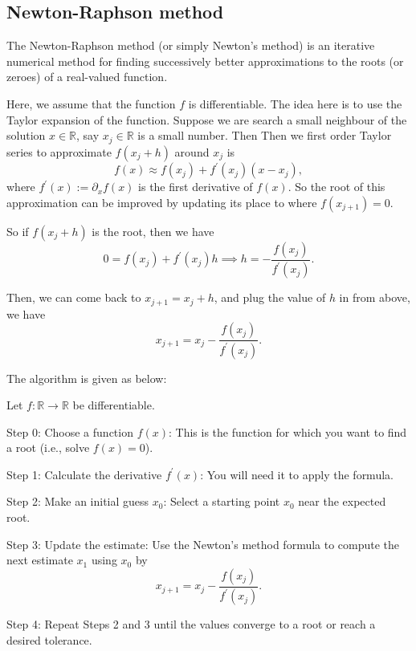 \documentclass[
  letterpaper,
  DIV=11,
  numbers=noendperiod]{scrreprt}
\begin{document}
\subsection{Newton-Raphson method}\label{newton-raphson-method}

The Newton-Raphson method (or simply Newton's method) is an iterative
numerical method for finding successively better approximations to the
roots (or zeroes) of a real-valued function.

Here, we assume that the function \(f\) is differentiable. The idea here
is to use the Taylor expansion of the function. Suppose we are search a
small neighbour of the solution \(x \in \mathbb R\), say
\(x_j \in \mathbb R\) is a small number. Then Then we first order Taylor
series to approximate \(f(x_j+h)\) around \(x_j\) is \[
f(x)\approx f(x_j) +  f^\prime(x_j) (x-x_j),
\] where \(f^\prime(x) := \partial_x f(x)\) is the first derivative of
\(f(x)\). So the root of this approximation can be improved by updating
its place to where \(f(x_{j+1}) = 0\).

So if \(f(x_j+h)\) is the root, then we have
\[ 0 = f(x_j) + f^\prime(x_j) h \implies h = -\frac{f(x_j)}{f^\prime(x_j)}.\]

Then, we can come back to \(x_{j+1}= x_j+h\), and plug the value of
\(h\) in from above, we have \[
x_{j+1} = x_j - \frac{f(x_j)}{f^\prime(x_j)}.
\]

The algorithm is given as below:

Let \(f:\mathbb R\to\mathbb R\) be differentiable.

Step 0: Choose a function \(f(x)\): This is the function for which you
want to find a root (i.e., solve \(f(x) = 0\)).

Step 1: Calculate the derivative \(f^\prime(x)\): You will need it to
apply the formula.

Step 2: Make an initial guess \(x_0\): Select a starting point \(x_0\)
near the expected root.

Step 3: Update the estimate: Use the Newton's method formula to compute
the next estimate \(x_1\) using \(x_0\) by
\[x_{j+1} = x_j - \frac{f(x_j)}{f^\prime(x_j)}.\]

Step 4: Repeat Steps 2 and 3 until the values converge to a root or
reach a desired tolerance.
\end{document}
